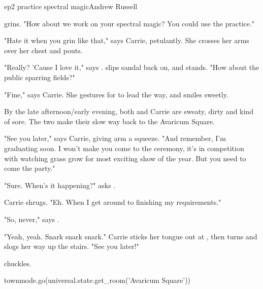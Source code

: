 \documentclass{book}
\begin{document}
\begin{childnode}{ep2 practice spectral magic}{Andrew Russell}

    \name{} grins. "How about we work on your spectral magic? You could use the practice."

    "Hate it when you grin like that," says Carrie, petulantly. She crosses her arms over her chest and pouts.

    "Really? 'Cause I love it," says \name{}. \HeShe{} slips \hisher{} sandal back on, and stands. "How about the public sparring fields?"

    "Fine," says Carrie. She gestures for \name{} to lead the way, and smiles sweetly.

    By the late afternoon/early evening, both \name{} and Carrie are sweaty, dirty and kind of sore. The two make their slow way back to the Avaricum Square.

    "See you later," says Carrie, giving \names{} arm a squeeze. "And remember, I'm graduating soon. I won't make you come to the ceremony, it's in competition with watching grass grow for
    most exciting show of the year. But you need to come the party."

    "Sure. When's it happening?" asks \name{}.

    Carrie shrugs. "Eh. When I get around to finishing my requirements."

    "So, never," says \name{}.

    "Yeah, yeah. Snark snark snark." Carrie sticks her tongue out at \name{}, then turns and slogs her way up the stairs. "See you later!"

    \name{} chuckles. 

    \begin{code}

        townmode.go(universal.state.get\_room('Avaricum Square'))

    \end{code}

\end{childnode}
\end{document}
